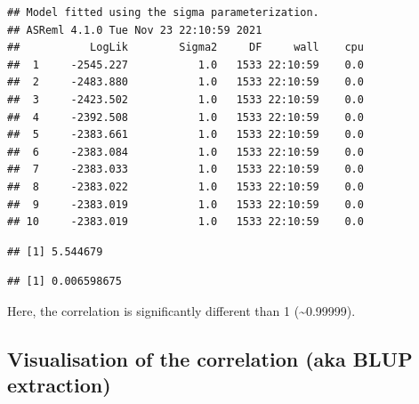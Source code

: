 \documentclass[
  12pt,
]{book}
\newenvironment{Shaded}{\begin{snugshade}}{\end{snugshade}}
\newcommand{\DataTypeTok}[1]{\textcolor[rgb]{0.13,0.29,0.53}{#1}}
\newcommand{\DecValTok}[1]{\textcolor[rgb]{0.00,0.00,0.81}{#1}}
\newcommand{\FloatTok}[1]{\textcolor[rgb]{0.00,0.00,0.81}{#1}}
\newcommand{\KeywordTok}[1]{\textcolor[rgb]{0.13,0.29,0.53}{\textbf{#1}}}
\newcommand{\NormalTok}[1]{#1}
\newcommand{\OperatorTok}[1]{\textcolor[rgb]{0.81,0.36,0.00}{\textbf{#1}}}
\newcommand{\StringTok}[1]{\textcolor[rgb]{0.31,0.60,0.02}{#1}}
\begin{document}
\begin{verbatim}
## Model fitted using the sigma parameterization.
## ASReml 4.1.0 Tue Nov 23 22:10:59 2021
##           LogLik        Sigma2     DF     wall    cpu
##  1     -2545.227           1.0   1533 22:10:59    0.0
##  2     -2483.880           1.0   1533 22:10:59    0.0
##  3     -2423.502           1.0   1533 22:10:59    0.0
##  4     -2392.508           1.0   1533 22:10:59    0.0
##  5     -2383.661           1.0   1533 22:10:59    0.0
##  6     -2383.084           1.0   1533 22:10:59    0.0
##  7     -2383.033           1.0   1533 22:10:59    0.0
##  8     -2383.022           1.0   1533 22:10:59    0.0
##  9     -2383.019           1.0   1533 22:10:59    0.0
## 10     -2383.019           1.0   1533 22:10:59    0.0
\end{verbatim}

\begin{Shaded}
\end{Shaded}

\begin{verbatim}
## [1] 5.544679
\end{verbatim}

\begin{Shaded}
\end{Shaded}

\begin{verbatim}
## [1] 0.006598675
\end{verbatim}

Here, the correlation is significantly different than 1 (\textasciitilde0.99999).

\hypertarget{visualisation-of-the-correlation-aka-blup-extraction}{%
\subsection{Visualisation of the correlation (aka BLUP extraction)}\label{visualisation-of-the-correlation-aka-blup-extraction}}
\end{document}
